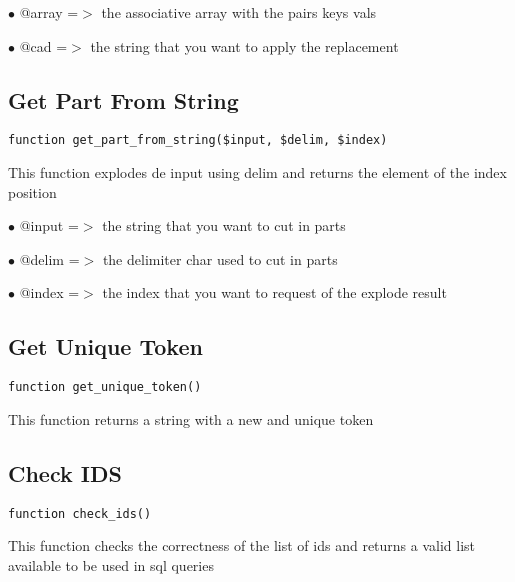 \documentclass[a4paper]{book}
\begin{document}
\begin{compactitem}
\item[\color{myblue}$\bullet$] @array =$>$ the associative array with the pairs keys vals
\item[\color{myblue}$\bullet$] @cad   =$>$ the string that you want to apply the replacement
\end{compactitem}

\hypertarget{toc281}{}
\subsection{Get Part From String}

\begin{lstlisting}
function get_part_from_string($input, $delim, $index)
\end{lstlisting}

This function explodes de input using delim and returns the element
of the index position

\begin{compactitem}
\item[\color{myblue}$\bullet$] @input =$>$ the string that you want to cut in parts
\item[\color{myblue}$\bullet$] @delim =$>$ the delimiter char used to cut in parts
\item[\color{myblue}$\bullet$] @index =$>$ the index that you want to request of the explode result
\end{compactitem}

\hypertarget{toc282}{}
\subsection{Get Unique Token}

\begin{lstlisting}
function get_unique_token()
\end{lstlisting}

This function returns a string with a new and unique token

\hypertarget{toc283}{}
\subsection{Check IDS}

\begin{lstlisting}
function check_ids()
\end{lstlisting}

This function checks the correctness of the list of ids and returns
a valid list available to be used in sql queries
\end{document}
